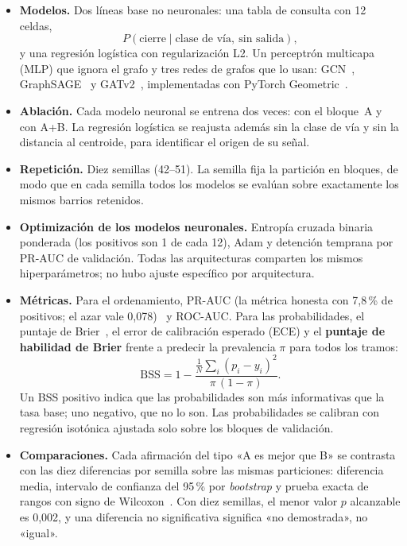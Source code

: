 \documentclass[11pt,a4paper]{article}
\begin{document}
\begin{itemize}
  \item \textbf{Modelos.} Dos líneas base no neuronales: una tabla de consulta con 12 celdas,
    \[ P(\text{cierre}\mid\text{clase de vía},\ \text{sin salida}), \]
    y una regresión
    logística con regularización L2. Un perceptrón multicapa (MLP) que ignora el grafo y tres redes
    de grafos que lo usan: GCN~\cite{kipf2017}, GraphSAGE~\cite{hamilton2017} y
    GATv2~\cite{brody2022}, implementadas con PyTorch Geometric~\cite{fey2019}.
  \item \textbf{Ablación.} Cada modelo neuronal se entrena dos veces: con el bloque~A y con A+B.
    La regresión logística se reajusta además sin la clase de vía y sin la distancia al centroide,
    para identificar el origen de su señal.
  \item \textbf{Repetición.} Diez semillas (42--51). La semilla fija la partición en bloques, de
    modo que en cada semilla todos los modelos se evalúan sobre exactamente los mismos barrios
    retenidos.
  \item \textbf{Optimización de los modelos neuronales.} Entropía cruzada binaria ponderada (los
    positivos son 1 de cada 12), Adam y detención temprana por PR-AUC de validación. Todas las
    arquitecturas comparten los mismos hiperparámetros; no hubo ajuste específico por arquitectura.
  \item \textbf{Métricas.} Para el ordenamiento, PR-AUC (la métrica honesta con 7,8\,\% de
    positivos; el azar vale 0,078)~\cite{saito2015} y ROC-AUC. Para las probabilidades, el puntaje
    de Brier~\cite{brier1950}, el error de calibración esperado (ECE) y el \textbf{puntaje de
    habilidad de Brier} frente a predecir la prevalencia $\pi$ para todos los tramos:
    \begin{equation}
      \mathrm{BSS} = 1 - \frac{\frac{1}{N}\sum_{i}(p_i - y_i)^2}{\pi\,(1-\pi)} .
    \end{equation}
    Un BSS positivo indica que las probabilidades son más informativas que la tasa base; uno
    negativo, que no lo son. Las probabilidades se calibran con regresión isotónica ajustada solo
    sobre los bloques de validación.
  \item \textbf{Comparaciones.} Cada afirmación del tipo «A es mejor que B» se contrasta con las
    diez diferencias por semilla sobre las mismas particiones: diferencia media, intervalo de
    confianza del 95\,\% por \emph{bootstrap} y prueba exacta de rangos con signo de
    Wilcoxon~\cite{wilcoxon1945}. Con diez semillas, el menor valor $p$ alcanzable es 0,002, y una
    diferencia no significativa significa «no demostrada», no «igual».
\end{itemize}
\end{document}
